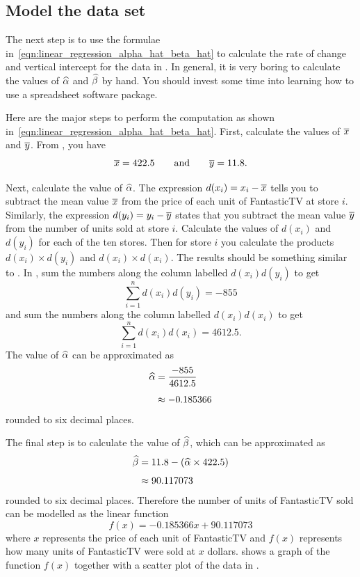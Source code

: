 \documentclass[a4paper,oneside,12pt]{article}
\begin{document}

\subsection*{Model the data set}

The next step is to use the formulae
in~\eqref{eqn:linear_regression_alpha_hat_beta_hat} to calculate the
rate of change and vertical intercept for the data in
.  In general, it is very boring to calculate the
values of $\widehat{\alpha}$ and $\widehat{\beta}$ by hand.  You should invest some
time into learning how to use a spreadsheet software package.

Here are the major steps to perform the computation as shown
in~\eqref{eqn:linear_regression_alpha_hat_beta_hat}.  First, calculate
the values of $\overline{x}$ and $\overline{y}$.  From , you have
\[
\overline{x}
=
422.5
\qquad
\text{and}
\qquad
\overline{y}
=
11.8.
\]

Next, calculate the value of $\widehat{\alpha}$.  The expression
$d(x_i) = x_i - \overline{x}$ tells you to subtract the mean value $\overline{x}$
from the price of each unit of FantasticTV at store $i$.  Similarly,
the expression $d(y_i) = y_i - \overline{y}$ states that you subtract the
mean value $\overline{y}$ from the number of units sold at store $i$.
Calculate the values of $d(x_i)$ and $d(y_i)$ for each of the ten
stores.  Then for store $i$ you calculate the products
$d(x_i) \times d(y_i)$ and $d(x_i) \times d(x_i)$.  The results should
be something similar to
.  In
, sum the numbers
along the column labelled $d(x_i) d(y_i)$ to get
\[
\sum_{i=1}^n d(x_i) d(y_i)
=
-855
\]
and sum the numbers along the column labelled $d(x_i) d(x_i)$ to get
\[
\sum_{i=1}^n d(x_i) d(x_i)
=
4612.5.
\]
The value of $\widehat{\alpha}$ can be approximated as
\begin{align*}
\widehat{\alpha}
&=
\frac{-855}{4612.5} \\[4pt]
&\approx
-0.185366
\end{align*}
rounded to six decimal places.

The final step is to calculate the value of $\widehat{\beta}$, which can be
approximated as
\begin{align*}
\widehat{\beta}
&=
11.8 - (\widehat{\alpha} \times 422.5) \\[4pt]
&\approx
90.117073
\end{align*}
rounded to six decimal places.  Therefore the number of units of
FantasticTV sold can be modelled as the linear function
\[
f(x)
=
-0.185366 x + 90.117073
\]
where $x$ represents the price of each unit of FantasticTV and $f(x)$
represents how many units of FantasticTV were sold at $x$ dollars.
 shows a graph of the function
$f(x)$ together with a scatter plot of the data in
.
\end{document}
